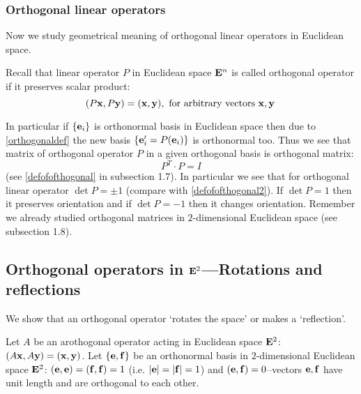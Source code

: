 \documentclass[12pt]{article}
\numberwithin{equation}{section}
\begin{document}
 \subsubsection {Orthogonal linear operators}

   Now we study geometrical meaning of
orthogonal linear operators in Euclidean space.



    Recall that linear operator $P$ in Euclidean space ${\bf E}^n$
is called orthogonal operator if it preserves scalar product:
        \begin{equation}\label{orthogonaldef}
        (P{\bf x}, P{\bf y})=({\bf x},{\bf y}), \hbox{ for arbitrary vectors ${\bf x},{\bf y}$}\,
          \end{equation}

In particular if $\{{\bf e}_i\}$ is orthonormal basis in Euclidean space then
due to \eqref{orthogonaldef} the new basis $\{{\bf e}'_i=P({\bf e}_i)\}$ is orthonormal too. Thus we see that matrix of orthogonal operator $P$ in a given orthogonal
basis is orthogonal matrix:
         \begin{equation}\label{orthogonallinearoperator}
                   P^T\cdot P=I
                   \end{equation}
 (see \eqref{defofofthogonal} in subsection 1.7).
   In particular we see that for orthogonal linear operator
     $\det P=\pm 1$ (compare with \eqref{defofofthogonal2}).
     If
   $\det P=1$ then it preserves orientation and if $\det P=-1$
   then it changes orientation.
Remember we already studied orthogonal matrices in
$2$-dimensional Euclidean space (see subsection 1.8).



\subsection{Orthogonal operators in ${\bf E}^2$---Rotations and reflections}


We show that an orthogonal operator `rotates the space' 
or makes a `reflection'.

   Let $A$ be an arothogonal operator acting in Euclidean space  ${\bf E}^2$:
   $(A{\bf x},A{\bf y})=({\bf x},{\bf y})$. Let $\{{\bf e},{\bf f}\}$ be an orthonormal 
basis in $2$-dimensional Euclidean space ${\bf E}^2$:
$({\bf e},{\bf e})=({\bf f},{\bf f})=1$ (i.e. $|{\bf e}|=|{\bf f}|=1$) and $({\bf e},{\bf f})=0$--vectors ${\bf e},{\bf f}$ have unit length and are orthogonal to each other.
\end{document}
